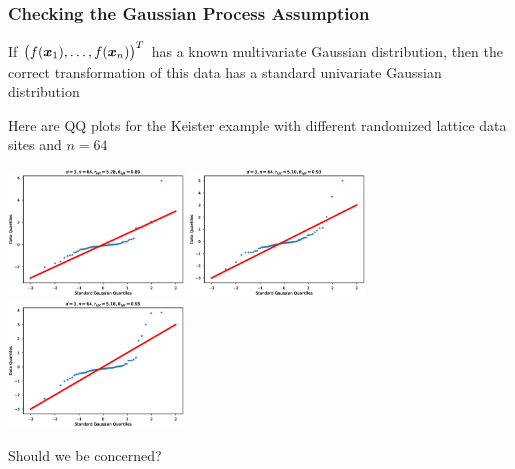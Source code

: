 \documentclass[11pt,compress,xcolor={usenames,dvipsnames},aspectratio=169]{beamer}
\begin{document}
\begin{frame}[fragile]\frametitle{Checking the Gaussian Process Assumption}

\vspace{-3ex}
If $\bigl(f(\boldsymbol{x}_1), \ldots, f(\boldsymbol{x}_n)\bigr) ^T$ has a known multivariate Gaussian distribution, then the correct transformation of this data has a standard univariate Gaussian distribution

Here are QQ plots for the Keister example with different randomized lattice data sites and $n=64$

\centerline{%
    \includegraphics[width=0.35\textwidth]{figures/Keister-QQPlot_n-64_d-3_case-7.eps} \hspace{-3ex}
	\includegraphics[width=0.35\textwidth]{figures/Keister-QQPlot_n-64_d-3_case-1.eps} \hspace{-3ex}
	\includegraphics[width=0.35\textwidth]{figures/Keister-QQPlot_n-64_d-3_case-2.eps}}

Should we be concerned?

\end{frame}
\end{document}
